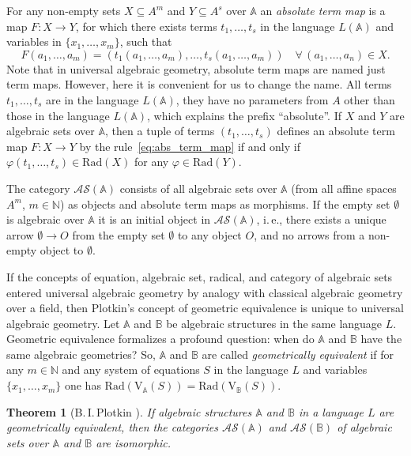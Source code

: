 \documentclass[12pt]{article}
\newtheorem{theorem}{Theorem}
\theoremstyle{definition}
\def\N{{\mathbb{N}}}
\def\MA{{\mathbb{A}}}
\def\MB{{\mathbb{B}}}
\def\AS{{\mathcal{AS}}}
\def\Rad{{\mathrm{Rad}}}
\def\V{{\mathrm{V}}}
\begin{document}
For any non-empty sets $X\subseteq A^m$ and $Y\subseteq A^s$ over $\MA$ an {\em absolute term map} is a map $F\colon X\to Y$, for which there exists terms $t_1,\ldots,t_s$ in the language $L(\MA)$ and variables in $\{x_1,\ldots,x_m\}$, such that 
\begin{equation}\label{eq:abs_term_map}
  F(a_1,\ldots,a_m)=(t_1(a_1,\ldots,a_m),\ldots,t_s(a_1,\ldots,a_m))\quad \forall\,(a_1,\ldots,a_n)\in X.  
\end{equation}
Note that in universal algebraic geometry, absolute term maps are named just term maps. However, here it is convenient for us to change the name. All terms $t_1,\ldots,t_s$ are in the language $L(\MA)$, they have no parameters from $A$ other than those in the language $L(\MA)$, which explains the prefix ``absolute''. If $X$ and $Y$ are algebraic sets over $\MA$, then a tuple of terms $(t_1,\ldots,t_s)$ defines an absolute term map $F\colon X\to Y$ by the rule~\eqref{eq:abs_term_map} if and only if $\varphi(t_1,\ldots,t_s)\in \Rad(X)$ for any $\varphi\in\Rad(Y)$.

The category $\AS(\MA)$ consists of all algebraic sets over $\MA$ (from all affine spaces $A^m$, $m\in \N$) as objects and absolute term maps as morphisms. If the empty set $\emptyset$ is algebraic over $\MA$ it is an initial object in $\AS(\MA)$, i.\,e., there exists a unique arrow $\emptyset \to O$ from the empty set $\emptyset$ to any object $O$, and no arrows from a non-empty object to $\emptyset$. 

If the concepts of equation, algebraic set, radical, and category of algebraic sets entered universal algebraic geometry by analogy with classical algebraic geometry over a field, then Plotkin’s concept of geometric equivalence is unique to universal algebraic geometry. Let $\MA$ and $\MB$ be algebraic structures in the same language $L$. Geometric equivalence formalizes a profound question: when do $\MA$ and $\MB$ have the same algebraic geometries? So, $\MA$ and $\MB$ are called {\em geometrically equivalent} if for any $m\in \N$ and any system of equations $S$ in the language $L$ and variables $\{x_1,\ldots,x_m\}$ one has $\Rad(\V_\MA(S))=\Rad(\V_\MB(S))$.

\begin{theorem}[B.\,I.\,Plotkin \cite{Plotkin3}]\label{th:Plotkin1}
If algebraic structures $\MA$ and $\MB$ in a language $L$ are geometrically equivalent, then the categories $\AS(\MA)$ and $\AS(\MB)$ of algebraic sets over $\MA$ and $\MB$ are isomorphic.
\end{theorem}
\end{document}
